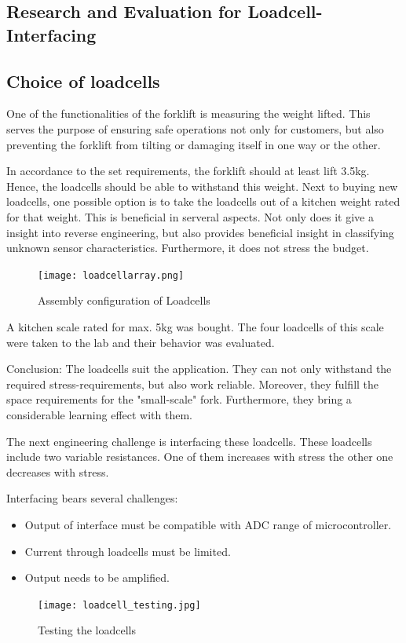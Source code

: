 \documentclass[../report.tex]{subfiles}
\begin{document}
\subsection{Research and Evaluation for Loadcell-Interfacing}

\subsection{Choice of loadcells}

One of the functionalities of the forklift is measuring the weight lifted.
This serves the purpose of ensuring safe operations not only for customers, 
but also preventing the forklift from tilting or damaging itself in one way or the other.

In accordance to the set requirements, the forklift should at least lift 3.5kg.
Hence, the loadcells should be able to withstand this weight. 
Next to buying new loadcells, one possible option is to take the loadcells
out of a kitchen weight rated for that weight. This is beneficial in serveral aspects.
Not only does it give a insight into reverse engineering, but also provides beneficial
insight in classifying unknown sensor characteristics. Furthermore, it does not 
stress the budget. 

\quad
\begin{figure}[H]
  \centering
  \texttt{[image: loadcellarray.png]}
  \caption{Assembly configuration of Loadcells}
\end{figure}

A kitchen scale rated for max. 5kg was bought. The four loadcells of this scale were taken to the lab and
their behavior was evaluated. 

\quad

Conclusion: The loadcells suit the application. They can not only withstand the
required stress-requirements, but also work reliable. Moreover, they fulfill the 
space requirements for the "small-scale" fork. Furthermore, they bring a considerable
learning effect with them.

\quad

The next engineering challenge is interfacing these loadcells.
These loadcells include two variable resistances. One of them increases
with stress the other one decreases with stress. 

\quad

Interfacing bears several challenges:

\begin{itemize}

  \item Output of interface must be compatible with ADC range of microcontroller.
  \item Current through loadcells must be limited.
  \item Output needs to be amplified.

\end{itemize}
\begin{figure}[H]
  \centering
  \texttt{[image: loadcell\_testing.jpg]}
  \caption{Testing the loadcells}
\end{figure} 
\end{document}
